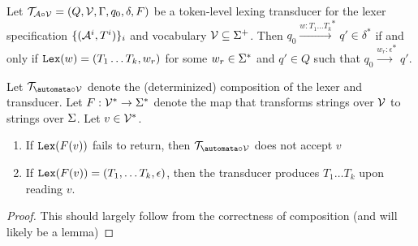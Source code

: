 \begin{theorem}
    \label{thm:LexingTransducerMemoryless}
    Let $\mathcal{T}_{\mathcal{A} \circ \mathcal{V}} = (Q, \mathcal{V}, \Gamma, q_0, \delta, F)$ be a token-level lexing transducer for the lexer specification $\{(\mathcal{A}^i, T^i)\}_i$ and vocabulary $\mathcal{V} \subseteq \Sigma^+$. Then $q_0 \xrightarrow{w:T_1 \ldots T_k}^{\ast} q' \in \delta^\ast$
    if and only if $\mathtt{Lex}(w) = (T_1 \ldots T_k, w_r)$ for some $w_r \in \Sigma^\ast$ and $q' \in Q$ such that $q_0 \xrightarrow{w_r:\epsilon}^\ast q'$.
\end{theorem}

\begin{theorem}
    \label{thm:CompositeLexTransducerLexEquiv}
    Let $\transducer_{\automata \circ \vocab}$ denote the (determinized) composition of the lexer and transducer. Let $F : \mathcal{V}^{*} \to \Sigma^{*}$ denote the map that transforms strings over $\mathcal{V}$ to strings over $\Sigma$. Let $v \in \mathcal{V}^{*}$.

    \begin{enumerate}
        \item If $\mathtt{Lex}(F(v))$ fails to return, then $\transducer_{\automata \circ \vocab}$ does not accept $v$
        \item If $\mathtt{Lex}(F(v)) = (T_1, \ldots T_k, \epsilon)$, then the transducer produces $T_1 \ldots T_k$ upon reading $v$.
    \end{enumerate}
\end{theorem}
\begin{proof}
    This should largely follow from the correctness of composition (and will likely be a lemma)
\end{proof}
